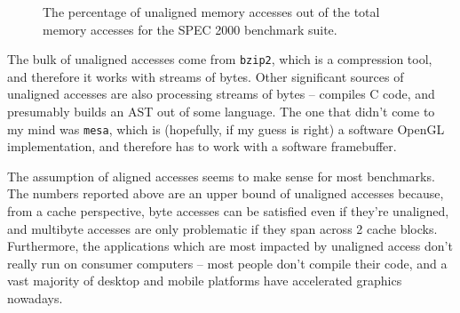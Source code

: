 \begin{figure}[htb]
\center

\caption{The percentage of unaligned memory accesses out of the total memory
accesses for the SPEC 2000 benchmark suite. }
\label{q5:unaligned_accesses}
\end{figure}

The bulk of unaligned accesses come from \texttt{bzip2}, which is a compression
tool, and therefore it works with streams of bytes. Other significant sources
of unaligned accesses are also processing streams of bytes -- 
compiles C code, and  presumably builds an AST out of some
language. The one that didn't come to my mind was \texttt{mesa}, which is
(hopefully, if my guess is right) a software OpenGL implementation, and
therefore has to work with a software framebuffer.

The assumption of aligned accesses seems to make sense for most benchmarks. The
numbers reported above are an upper bound of unaligned accesses because, from a
cache perspective, byte accesses can be satisfied even if they're unaligned, and
multibyte accesses are only problematic if they span across 2 cache blocks.
Furthermore, the applications which are most impacted by unaligned access don't
really run on consumer computers -- most people don't compile their code, and a
vast majority of desktop and mobile platforms have accelerated graphics
nowadays.
